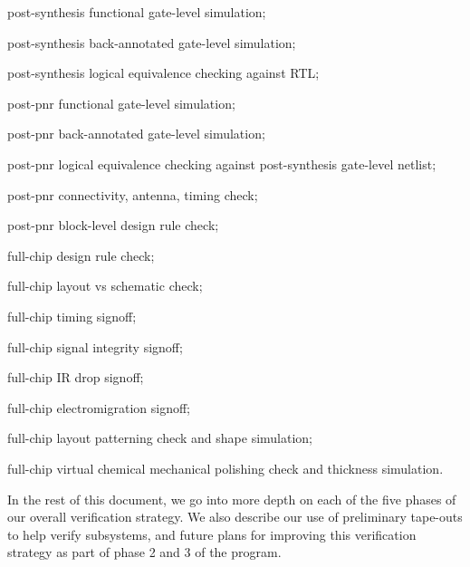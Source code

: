 \begin{cbxlist}{1.5em}{1em}{1em}
\begin{cbxlist}[--]{1.5em}{0em}{0em}
      \item post-synthesis functional gate-level simulation;
      \item post-synthesis back-annotated gate-level simulation;
      \item post-synthesis logical equivalence checking against RTL;
      \item post-pnr functional gate-level simulation;
      \item post-pnr back-annotated gate-level simulation;
      \item post-pnr logical equivalence checking against post-synthesis
         gate-level netlist;
      \item post-pnr connectivity, antenna, timing check;
      \item post-pnr block-level design rule check;
      \item full-chip design rule check;
      \item full-chip layout vs schematic check;
      \item full-chip timing signoff;
      \item full-chip signal integrity signoff;
      \item full-chip IR drop signoff;
      \item full-chip electromigration signoff;
      \item full-chip layout patterning check and shape simulation;
      \item full-chip virtual chemical mechanical polishing check and
         thickness simulation.

    \end{cbxlist}

\end{cbxlist}

\medskip\noindent
In the rest of this document, we go into more depth on each of the
five phases of our overall verification strategy. We also describe our
use of preliminary tape-outs to help verify subsystems, and future plans
for improving this verification strategy as part of phase 2 and 3 of the
program.
